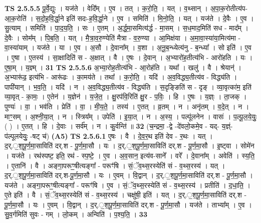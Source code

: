 \documentclass[17pt]{extarticle}
\begin{document}
                  \newline
                                \textbf{ TS 2.5.5.5} \newline
                  पू॒र्वे॒द्युः । यज॑ते । वेदि᳚म् । ए॒व । तत् । क॒रो॒ति॒ । यत् । व॒थ्सान् । अ॒पा॒क॒रोतीत्य॑प-आ॒क॒रोति॑ । स॒दो॒ह॒वि॒र्द्धा॒ने इति॑ सदः-ह॒वि॒र्द्धा॒ने । ए॒व । समिति॑ । मि॒नो॒ति॒ । यत् । यज॑ते । दे॒वैः । ए॒व । सु॒त्याम् । समिति॑ । पा॒द॒य॒ति॒ । सः । ए॒तम् । अ॒र्द्ध॒मा॒समित्य॑र्द्ध - मा॒सम् । स॒ध॒माद॒मिति॑ सध - माद᳚म् । दे॒वैः । सोम᳚म् । पि॒ब॒ति॒ । यत् । मै॒त्रा॒व॒रु॒ण्येति॑ मैत्रा - व॒रु॒ण्या । आ॒मिक्ष॑या । अ॒मा॒वा॒स्या॑या॒मित्य॑मा - वा॒स्या॑याम् । यज॑ते । या । ए॒व । अ॒सौ । दे॒वाना᳚म् । व॒शा । अ॒नू॒ब॒न्ध्येत्य॑नु - ब॒न्ध्या᳚ । सो इति॑ । ए॒व । ए॒षा । ए॒तस्य॑ । सा॒क्षादिति॑ स - अ॒क्षात् । वै । ए॒षः । दे॒वान् । अ॒भ्यारो॑ह॒तीत्य॑भि - आरो॑हति । यः । ए॒षा॒म् । य॒ज्ञ्म् । \textbf{  31} \newline
                  \newline
                                \textbf{ TS 2.5.5.6} \newline
                  अ॒भ्या॒रोह॒तीत्य॑भि - आ॒रोह॑ति । यथा᳚ । खलु॑ । वै । श्रेयान्॑ । अ॒भ्यारू॑ढ॒ इत्य॑भि - आरू॑ढः । का॒मय॑ते । तथा᳚ । क॒रो॒ति॒ । यदि॑ । अ॒व॒विद्ध्य॒तीत्य॑व - विद्ध्य॑ति । पापी॑यान् । भ॒व॒ति॒ । यदि॑ । न । अ॒व॒विद्ध्य॒तीत्य॑व - विद्ध्य॑ति । स॒दृङ्ङिति॑ स - दृङ् । व्या॒वृत्का॑म॒ इति॑ व्या॒वृत् - का॒मः॒ । ए॒तेन॑ । य॒ज्ञेन॑ । य॒जे॒त॒ । क्षु॒रप॑वि॒रिति॑ क्षु॒र - प॒विः॒ । हि । ए॒षः । य॒ज्ञ्ः । ता॒जक् । पुण्यः॑ । वा॒ । भव॑ति । प्रेति॑ । वा॒ । मी॒य॒ते॒ । तस्य॑ । ए॒तत् । व्र॒तम् । न । अनृ॑तम् । व॒दे॒त् । न । माꣳ॒॒सम् । अ॒श्नी॒या॒त् । न । स्त्रिय᳚म् । उपेति॑ । इ॒या॒त् । न । अ॒स्य॒ । पल्पू॑लनेन । वासः॑ । प॒ल्पू॒ल॒ये॒युः॒ ( ) । ए॒तत् । हि । दे॒वाः । सर्व᳚म् । न । कु॒र्वन्ति॑ ॥ \textbf{  32} \newline
                  \newline
                      (च॒न्द्रमा॒ -द्वे -दे॑वलो॒कमे॒व - यद्- य॒ज्ञ्ं- प॑ल्पूलयेयुः॒ -षट् च॑)  \textbf{(A5)} \newline \newline
                                \textbf{ TS 2.5.6.1} \newline
                  ए॒षः । वै । दे॒व॒र॒थ इति॑ देव - र॒थः । यत् । द॒र्.॒श॒पू॒र्ण॒मा॒साविति॑ दर्.श - पू॒र्ण॒मा॒सौ । यः । द॒र्.॒श॒पू॒र्ण॒मा॒साविति॑ दर्.श - पू॒र्ण॒मा॒सौ । इ॒ष्ट्वा । सोमे॑न । यज॑ते । रथ॑स्पष्ट॒ इति॒ रथ॑ - स्प॒ष्टे॒ । ए॒व । अ॒व॒सान॒ इत्य॑व-साने᳚ । वरे᳚ । दे॒वाना᳚म् । अवेति॑ । स्य॒ति॒ । ए॒तानि॑ । वै । अङ्गा॒परूꣳ॒॒षीत्यङ्गा᳚ - परूꣳ॑षि । सं॒ॅव॒थ्स॒रस्येति॑ सं - व॒थ्स॒रस्य॑ । यत् । द॒र्.॒श॒पू॒र्ण॒मा॒साविति॑ दर्.श-पू॒र्ण॒मा॒सौ । यः । ए॒वम् । वि॒द्वान् । द॒र्.॒श॒पू॒र्ण॒मा॒साविति॑ दर्.श - पू॒र्ण॒मा॒सौ । यज॑ते । अङ्गा॒परूꣳ॒॒षीत्यङ्गा᳚ - परूꣳ॑षि । ए॒व । सं॒ॅव॒थ्स॒रस्येति॑ सं - व॒थ्स॒रस्य॑ । प्रतीति॑ । द॒धा॒ति॒ । ए॒ते इति॑ । वै । सं॒ॅव॒थ्स॒रस्येति॑ सं - व॒थ्स॒रस्य॑ । चक्षु॑षी॒ इति॑ । यत् । द॒र्.॒श॒पू॒र्ण॒मा॒साविति॑ दर्.श - पू॒र्ण॒मा॒सौ । यः । ए॒वम् । वि॒द्वान् । द॒र्.॒श॒पू॒र्ण॒मा॒साविति॑ दर्.श - पू॒र्ण॒मा॒सौ । यज॑ते । ताभ्या᳚म् । ए॒व । सु॒व॒र्गमिति॑ सुवः - गम् । लो॒कम् । अन्विति॑ । प॒श्य॒ति॒ । \textbf{  33} \newline
\end{document}
